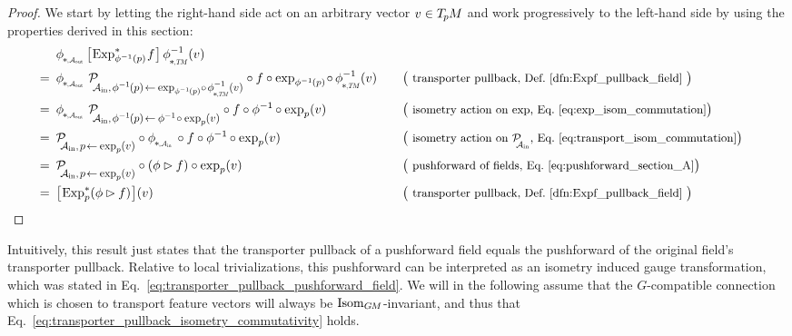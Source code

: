 \begin{proof}
    We start by letting the right-hand side act on an arbitrary vector $v\in T_{\mkern-1.5mu p}\mkern-.5muM$ and work progressively to the left-hand side by using the properties derived in this section:
    \begin{alignat}{3}
         &\,\ \dphiAout \big[\mkern-2mu \Expsphiinvpf \mkern1mu\big] \, \dphiTM^{-1} (v) \\
        =&\,\ \dphiAout\, \mathcal{P}_{\mkern-5mu\overset{}{\protect\scalebox{.8}{$\!\Ain$},\protect\scalebox{.85}{$\mkern2mu\phiinv(p) \mkern-3mu\leftarrow\mkern-1mu \exp_{\phiinv(p)} \!\circ\mkern2mu \dphiTM^{-1}(v)$}}}
            \circ f \circ \exp_{\phiinv(p)} \mkern-2mu\circ\, \dphiTM^{-1} (v)
            \quad && \big( \text{\small transporter pullback, Def.~\ref{dfn:Expf_pullback_field} } \big) \notag\\
        =&\,\ \dphiAout\, \mathcal{P}_{\mkern-5mu\overset{}{\protect\scalebox{.8}{$\!\Ain$},\protect\scalebox{.85}{$\mkern2mu\phiinv(p) \mkern-3mu\leftarrow\mkern-1mu \phiinv\mkern-2mu \circ \exp_p (v)$}}}
            \circ f \circ \phiinv \circ \exp_p (v)
            \quad && \big( \text{\small isometry action on $\exp$, Eq.~\eqref{eq:exp_isom_commutation}} \big) \notag\\
        =&\,\ \mathcal{P}_{\mkern-5mu\overset{}{\protect\scalebox{.8}{$\!\Ain$},\protect\scalebox{.85}{$\mkern2mu p \mkern-3mu\leftarrow\mkern-1mu \exp_p (v)$}}}
            \circ \dphiAin \circ f \circ \phiinv \circ \exp_p (v)
            \quad && \big( \text{\small isometry action on $\mathcal{P}_{\mkern-5mu\overset{}{\protect\scalebox{.75}{$\!\Ain$}}}$, Eq.~\eqref{eq:transport_isom_commutation}} \big) \notag\\
        =&\,\ \mathcal{P}_{\mkern-5mu\overset{}{\protect\scalebox{.8}{$\!\Ain$},\protect\scalebox{.85}{$\mkern2mu p \mkern-3mu\leftarrow\mkern-1mu \exp_p (v)$}}}
            \circ (\phi \rhd f) \circ \exp_p (v)
            \quad && \big( \text{\small pushforward of fields, Eq.~\eqref{eq:pushforward_section_A}} \big) \notag\\
        =&\,\ \big[\mkern-2mu \Expsp (\phi \rhd f) \mkern1mu\big] (v)
            \quad && \big( \text{\small transporter pullback, Def.~\ref{dfn:Expf_pullback_field} } \big) \notag
    \end{alignat}
\end{proof}
Intuitively, this result just states that the transporter pullback of a pushforward field equals the pushforward of the original field's transporter pullback.
Relative to local trivializations, this pushforward can be interpreted as an isometry induced gauge transformation, which was stated in Eq.~\eqref{eq:transporter_pullback_pushforward_field}.
We will in the following assume that the $G$-compatible connection which is chosen to transport feature vectors will always be $\operatorname{Isom}_{G\mkern-1.4muM}$-invariant, and thus that Eq.~\eqref{eq:transporter_pullback_isometry_commutativity} holds.


